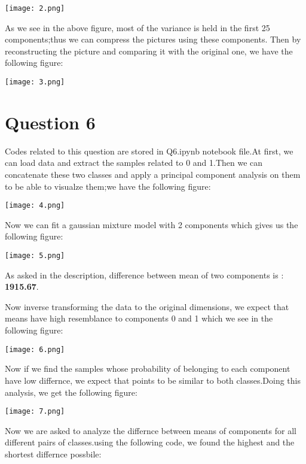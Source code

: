 \documentclass{article}
\begin{document}
\texttt{[image: 2.png]}

As we see in the above figure, most of the variance is held in the first 25 components;thus we can compress the pictures using these components.
Then by reconstructing the picture and comparing it with the original one, we have the following figure:

\texttt{[image: 3.png]}

\section*{Question 6}
Codes related to this question are stored in Q6.ipynb notebook file.At first, we can load data and extract the samples related to 0 and 1.Then
we can concatenate these two classes and apply a principal component analysis on them to be able to visualze them;we have the following figure:

\texttt{[image: 4.png]}

Now we can fit a gaussian mixture model with 2 components which gives us the following figure:

\texttt{[image: 5.png]}

As asked in the description, difference between mean of two components is : \textbf{1915.67}.

Now inverse transforming the data to the original dimensions, we expect that means have high resemblance to components 0 and 1 which 
we see in the following figure:

\texttt{[image: 6.png]}

Now if we find the samples whose probability of belonging to each component have low differnce, we expect that points to be 
similar to both classes.Doing this analysis, we get the following figure:

\texttt{[image: 7.png]}

Now we are asked to analyze the differnce between means of components for all different pairs of classes.using the following code, we found the 
highest and the shortest differnce possbile:
\end{document}
